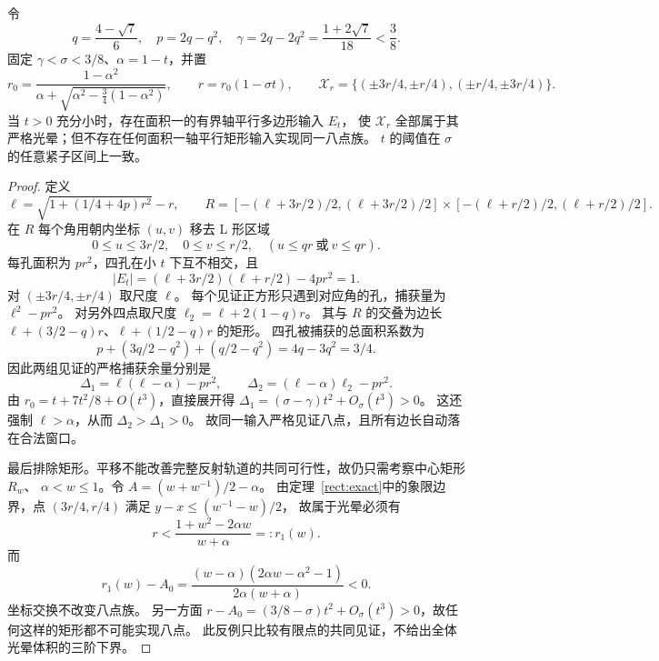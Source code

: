 \begin{theorem}[非矩形输入改善另一八点族]\label{wr:l-counterexample}
令
\[
 q=\frac{4-\sqrt7}{6},\quad p=2q-q^2,\quad
 \gamma=2q-2q^2=\frac{1+2\sqrt7}{18}<\frac38.
\]
固定 $\gamma<\sigma<3/8$、$\alpha=1-t$，并置
\[
 r_0=\frac{1-\alpha^2}{\alpha+\sqrt{\alpha^2-\tfrac34(1-\alpha^2)}},\qquad
 r=r_0(1-\sigma t),\qquad
 \mathscr X_r=\{(\pm3r/4,\pm r/4),(\pm r/4,\pm3r/4)\}.
\]
当 $t>0$ 充分小时，存在面积一的有界轴平行多边形输入 $E_t$，
使 $\mathscr X_r$ 全部属于其严格光晕；但不存在任何面积一轴平行矩形输入实现同一八点族。
$t$ 的阈值在 $\sigma$ 的任意紧子区间上一致。
\end{theorem}
\begin{proof}
定义
\[
 \ell=\sqrt{1+(1/4+4p)r^2}-r,
 \qquad R=[-(\ell+3r/2)/2,(\ell+3r/2)/2]
 \times[-(\ell+r/2)/2,(\ell+r/2)/2].
\]
在 $R$ 每个角用朝内坐标 $(u,v)$ 移去 L 形区域
\[
 0\le u\le3r/2,\quad0\le v\le r/2,\quad
 (u\le qr\ \text{或}\ v\le qr).
\]
每孔面积为 $pr^2$，四孔在小 $t$ 下互不相交，且
\[
 |E_t|=(\ell+3r/2)(\ell+r/2)-4pr^2=1.
\]
对 $(\pm3r/4,\pm r/4)$ 取尺度 $\ell$。
每个见证正方形只遇到对应角的孔，捕获量为 $\ell^2-pr^2$。
对另外四点取尺度 $\ell_2=\ell+2(1-q)r$。
其与 $R$ 的交叠为边长 $\ell+(3/2-q)r$、$\ell+(1/2-q)r$ 的矩形。
四孔被捕获的总面积系数为
\[
 p+(3q/2-q^2)+(q/2-q^2)=4q-3q^2=3/4.
\]
因此两组见证的严格捕获余量分别是
\[
 \Delta_1=\ell(\ell-\alpha)-pr^2,\qquad
 \Delta_2=(\ell-\alpha)\ell_2-pr^2.
\]
由 $r_0=t+7t^2/8+O(t^3)$，直接展开得
$\Delta_1=(\sigma-\gamma)t^2+O_\sigma(t^3)>0$。
这还强制 $\ell>\alpha$，从而 $\Delta_2>\Delta_1>0$。
故同一输入严格见证八点，且所有边长自动落在合法窗口。

最后排除矩形。平移不能改善完整反射轨道的共同可行性，故仍只需考察中心矩形 $R_w$、
$\alpha<w\le1$。令 $A=(w+w^{-1})/2-\alpha$。
由定理~\ref{rect:exact}中的象限边界，点 $(3r/4,r/4)$ 满足 $y-x\le(w^{-1}-w)/2$，
故属于光晕必须有
\[
 r<\frac{1+w^2-2\alpha w}{w+\alpha}=:r_1(w).
\]
而
\[
 r_1(w)-A_0=
 \frac{(w-\alpha)(2\alpha w-\alpha^2-1)}{2\alpha(w+\alpha)}<0.
\]
坐标交换不改变八点族。
另一方面 $r-A_0=(3/8-\sigma)t^2+O_\sigma(t^3)>0$，故任何这样的矩形都不可能实现八点。
此反例只比较有限点的共同见证，不给出全体光晕体积的三阶下界。
\end{proof}
